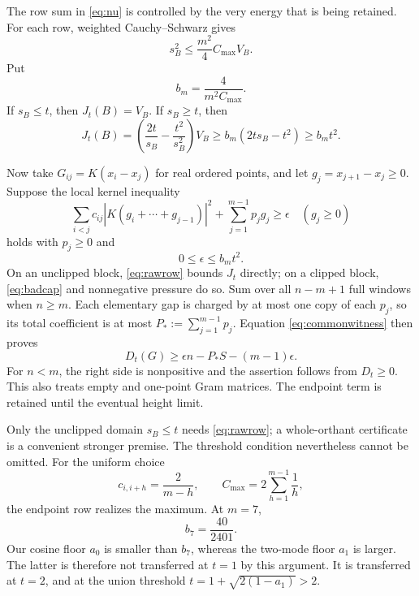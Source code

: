 \documentclass[11pt]{amsart}
\numberwithin{equation}{section}
\begin{document}
The row sum in \eqref{eq:nu} is controlled by the very energy that is
being retained. For each row, weighted Cauchy--Schwarz gives
\[
 s_B^2\le\frac{m^2}{4}C_{\max}V_B.
\]
Put
\begin{equation}
 b_m=\frac4{m^2C_{\max}}.\label{eq:bm}
\end{equation}
If $s_B\le t$, then $J_t(B)=V_B$. If $s_B\ge t$, then
\begin{equation}
 J_t(B)=\left(\frac{2t}{s_B}-\frac{t^2}{s_B^2}\right)V_B
 \ge b_m(2ts_B-t^2)\ge b_m t^2.\label{eq:badcap}
\end{equation}

Now take $G_{ij}=K(x_i-x_j)$ for real ordered points, and let
$g_j=x_{j+1}-x_j\ge0$. Suppose the local kernel inequality
\begin{equation}
 \sum_{i<j}c_{ij}\left|K(g_i+\cdots+g_{j-1})\right|^2
       +\sum_{j=1}^{m-1}p_jg_j\ge\epsilon
 \quad(g_j\ge0)\label{eq:rawrow}
\end{equation}
holds with $p_j\ge0$ and
\begin{equation}
 0\le\epsilon\le b_m t^2.\label{eq:capcondition}
\end{equation}
On an unclipped block, \eqref{eq:rawrow} bounds $J_t$ directly; on a
clipped block, \eqref{eq:badcap} and nonnegative pressure do so.
Sum over all $n-m+1$ full windows when $n\ge m$. Each elementary
gap is charged by at most one copy of each $p_j$, so its total
coefficient is at most $P_*:=\sum_{j=1}^{m-1}p_j$. Equation
\eqref{eq:commonwitness} then proves
\begin{equation}
 D_t(G)\ge\epsilon n-P_*S-(m-1)\epsilon.
 \label{eq:pressuretransfer}
\end{equation}
For $n<m$, the right side is nonpositive and the assertion follows
from $D_t\ge0$. This also treats empty and one-point Gram matrices.
The endpoint term is retained until the eventual height limit.

Only the unclipped domain $s_B\le t$ needs \eqref{eq:rawrow}; a
whole-orthant certificate is a convenient stronger premise. The
threshold condition nevertheless cannot be omitted. For the uniform
choice
\begin{equation}
 c_{i,i+h}=\frac2{m-h},\qquad
 C_{\max}=2\sum_{h=1}^{m-1}\frac1h,
 \label{eq:uniformweights}
\end{equation}
the endpoint row realizes the maximum. At $m=7$,
\begin{equation}
 b_7=\frac{40}{2401}.\label{eq:b7}
\end{equation}
Our cosine floor $a_0$ is smaller than $b_7$, whereas the two-mode
floor $a_1$ is larger. The latter is therefore not transferred at
$t=1$ by this argument. It is transferred at $t=2$, and at the
union threshold $t=1+\sqrt{2(1-a_1)}>2$.
\end{document}

